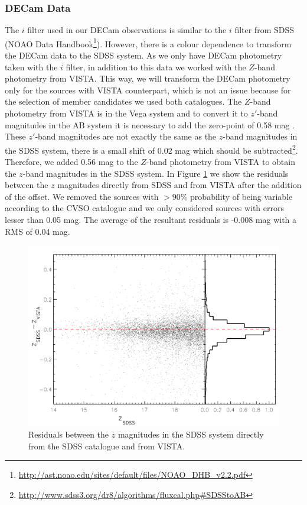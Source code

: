 \documentclass[12pt]{article}
\begin{document}
\subsubsection{DECam Data}
The $i$ filter used in our DECam observations is similar to the $i$ filter from SDSS (NOAO Data Handbook\footnote{\url{http://ast.noao.edu/sites/default/files/NOAO\_DHB\_v2.2.pdf}}). However, there is a colour dependence to transform the DECam data to the SDSS system. As we only have DECam photometry taken with the $i$ filter, in addition to this data we worked with the $Z$-band photometry from VISTA. This way, we will transform the DECam photometry only for the sources with VISTA counterpart, which is not an issue because for the selection of member candidates we used both catalogues. The $Z$-band photometry from VISTA is in the Vega system and to convert it to $z'$-band magnitudes in the AB system it is necessary to add the zero-point of 0.58 mag \citep{Pickles2010}. These $z'$-band magnitudes are not exactly the same as the $z$-band magnitudes in the SDSS system, there is a small shift of 0.02 mag which should be subtracted\footnote{\url{http://www.sdss3.org/dr8/algorithms/fluxcal.php\#SDSStoAB}}. Therefore, we added 0.56 mag to the $Z$-band photometry from VISTA to obtain the $z$-band magnitudes in the SDSS system. In Figure \ref{fig_IMF:trasformation_VISTA} we show the residuals between the $z$ magnitudes directly from SDSS and from VISTA after the addition of the offset. We removed the sources with $>90\%$ probability of being variable according to the CVSO catalogue and we only considered sources with errors lesser than 0.05 mag. The average of the resultant residuals is -0.008 mag with a RMS of 0.04 mag.

\begin{figure}
	\begin{minipage}{0.60\textwidth}
		\includegraphics[width=1.00\textwidth]{transformation_VISTA_PD2010.pdf}
	\end{minipage} \hfill
	\begin{minipage}{0.35\textwidth}
		\caption[$Z$ magnidutes from VISTA in the SDSS system.]{Residuals between the $z$ magnitudes in the SDSS system directly from the SDSS catalogue and from VISTA.}
		\label{fig_IMF:trasformation_VISTA}
	\end{minipage}
\end{figure}
\end{document}

